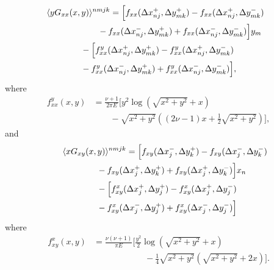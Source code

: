 \documentclass[aps,prl,reprint,twocolumn,groupedaddress,showpacs]{revtex4-1}
\begin{document}
\begin{align}
\lefteqn{\langle yG_{xx}(x,y) \rangle^{nmjk} = \Big[f_{xx}( \Delta x_{nj}^+,\Delta y_{mk}^+) - f_{xx}( \Delta x_{nj}^+,\Delta y_{mk}^-) } \nonumber\\
&\qquad\qquad\qquad-f_{xx}(\Delta x_{nj}^-, \Delta y_{mk}^+) + f_{xx}(\Delta x_{nj}^- , \Delta y_{mk}^-)  \Big] y_m\nonumber\\
&\qquad\qquad - \Big[ f^y_{xx}(\Delta x_{nj}^+,\Delta y_{mk}^+) - f^y_{xx}(\Delta x_{nj}^+,\Delta y_{mk}^-)\nonumber\\
&\qquad\qquad - f^y_{xx}(\Delta x_{nj}^-,\Delta y_{mk}^+) + f^y_{xx}(\Delta x_{nj}^-,\Delta y_{mk}^-)  \Big],
\end{align}
where
\begin{align}
f^y_{xx}(x,y) &=\frac{\nu+1}{2\pi E} \Bigg[y^2\log\left(\sqrt{x^2+y^2}+x \right)  \nonumber\\
&\qquad- \sqrt{x^2+y^2}\left((2\nu-1)x + \frac{1}{2}\sqrt{x^2+y^2} \right)  \Bigg],
\end{align}
and
\begin{align}
\lefteqn{\langle xG_{xy}(x,y) \rangle^{nmjk} = \Big[ f_{xy}(\Delta x_j^-, \Delta y_k^+) - f_{xy}(\Delta x_j^-,\Delta y_k^-) } \nonumber\\
&\qquad\qquad- f_{xy}(\Delta x_j^+,\Delta y_k^+) + f_{xy} (\Delta x_j^+,\Delta y_k^-) \Big]x_n\nonumber\\
&\qquad\qquad -   \Big[ f_{xy}^x(\Delta x_j^+,\Delta y_j^+) - f_{xy}^x(\Delta x_j^+,\Delta y_j^-) \nonumber\\
&\qquad\qquad- f_{xy}^x(\Delta x_j^-,\Delta y_j^+) + f_{xy}^x(\Delta x_j^-,\Delta y_j^-)\Big]
\end{align}
where
\begin{align}
f_{xy}^x(x,y) &=\frac{\nu(\nu+1)}{\pi E}\Big[ \frac{y^2}{2}\log\left(\sqrt{x^2+y^2} +x \right) \nonumber\\
&\qquad\qquad\qquad-\frac{1}{4}\sqrt{x^2+y^2}\left(\sqrt{x^2+y^2}+2x\right) \Big].
\end{align}

\end{document}
